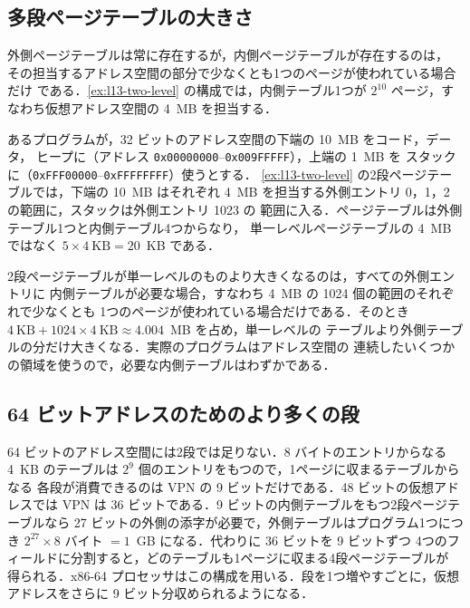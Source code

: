 \documentclass[../main.tex]{subfiles}
\begin{document}
\subsection{多段ページテーブルの大きさ}

外側ページテーブルは常に存在するが，内側ページテーブルが存在するのは，
その担当するアドレス空間の部分で少なくとも1つのページが使われている場合だけ
である．\cref{ex:l13-two-level} の構成では，内側テーブル1つが $2^{10}$
ページ，すなわち仮想アドレス空間の 4~MB を担当する．

\begin{example}
  \label{ex:l13-two-level-size}
  あるプログラムが，32 ビットのアドレス空間の下端の 10~MB をコード，データ，
  ヒープに（アドレス \texttt{0x00000000}--\texttt{0x009FFFFF}），上端の 1~MB を
  スタックに（\texttt{0xFFF00000}--\texttt{0xFFFFFFFF}）使うとする．
  \cref{ex:l13-two-level} の2段ページテーブルでは，下端の 10~MB はそれぞれ
  4~MB を担当する外側エントリ 0，1，2 の範囲に，スタックは外側エントリ 1023 の
  範囲に入る．ページテーブルは外側テーブル1つと内側テーブル4つからなり，
  単一レベルページテーブルの 4~MB ではなく
  $5 \times 4~\text{KB} = 20$~KB である．
\end{example}

2段ページテーブルが単一レベルのものより大きくなるのは，すべての外側エントリに
内側テーブルが必要な場合，すなわち 4~MB の 1024 個の範囲のそれぞれで少なくとも
1つのページが使われている場合だけである．そのとき
$4~\text{KB} + 1024 \times 4~\text{KB} \approx 4.004$~MB を占め，単一レベルの
テーブルより外側テーブルの分だけ大きくなる．実際のプログラムはアドレス空間の
連続したいくつかの領域を使うので，必要な内側テーブルはわずかである．

\subsection{64 ビットアドレスのためのより多くの段}

64 ビットのアドレス空間には2段では足りない．8 バイトのエントリからなる 4~KB
のテーブルは $2^{9}$ 個のエントリをもつので，1ページに収まるテーブルからなる
各段が消費できるのは VPN の 9 ビットだけである．48 ビットの仮想アドレスでは
VPN は 36 ビットである．9 ビットの内側テーブルをもつ2段ページテーブルなら
27 ビットの外側の添字が必要で，外側テーブルはプログラム1つにつき
$2^{27} \times 8$ バイト $= 1$~GB になる．代わりに 36 ビットを 9 ビットずつ
4つのフィールドに分割すると，どのテーブルも1ページに収まる4段ページテーブルが
得られる．x86-64 プロセッサはこの構成を用いる．段を1つ増やすごとに，仮想
アドレスをさらに 9 ビット分収められるようになる．
\end{document}
